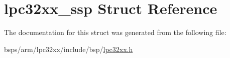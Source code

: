 \hypertarget{structlpc32xx__ssp}{}\section{lpc32xx\+\_\+ssp Struct Reference}
\label{structlpc32xx__ssp}


The documentation for this struct was generated from the following file\+:\begin{DoxyCompactItemize}
\item 
bsps/arm/lpc32xx/include/bsp/\mbox{\hyperlink{lpc32xx_8h}{lpc32xx.\+h}}\end{DoxyCompactItemize}

